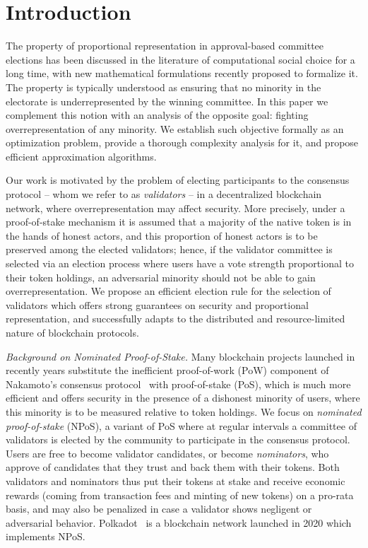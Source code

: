 \section{Introduction}

The property of proportional representation in approval-based committee elections has been discussed in the literature of computational social choice for a long time, with new mathematical formulations recently proposed to formalize it. 
The property is typically understood as ensuring that no minority in the electorate is underrepresented by the winning committee. 
In this paper we complement this notion with an analysis of the opposite goal: fighting overrepresentation of any minority. 
We establish such objective formally as an optimization problem, provide a thorough complexity analysis for it, and propose efficient approximation algorithms. 

Our work is motivated by the problem of electing participants to the consensus protocol -- whom we refer to as \emph{validators} -- in a decentralized blockchain network, where overrepresentation may affect security. 
More precisely, under a proof-of-stake mechanism it is assumed that a majority of the native token is in the hands of honest actors, and this proportion of honest actors is to be preserved among the elected validators; 
hence, if the validator committee is selected via an election process where users have a vote strength proportional to their token holdings, an adversarial minority should not be able to gain overrepresentation. 
We propose an efficient election rule for the selection of validators which offers strong guarantees on security and proportional representation, and successfully adapts to the distributed and resource-limited nature of blockchain protocols.

\emph{Background on Nominated Proof-of-Stake.}
Many blockchain projects launched in recently years substitute the inefficient proof-of-work (PoW) component of Nakamoto's consensus protocol~\cite{nakamoto2019bitcoin} with proof-of-stake (PoS), which is much more efficient and offers security in the presence of a dishonest minority of users, where this minority is to be measured relative to token holdings. 
We focus on \emph{nominated proof-of-stake} (NPoS), a variant of PoS where at regular intervals a committee of validators is elected by the community to participate in the consensus protocol. 
Users are free to become validator candidates, or become \emph{nominators}, who approve of candidates that they trust and back them with their tokens. 
Both validators and nominators thus put their tokens at stake and receive economic rewards (coming from transaction fees and minting of new tokens) on a pro-rata basis, and may also be penalized in case a validator shows negligent or adversarial behavior.
Polkadot~\cite{burdges2020overview} is a blockchain network launched in 2020 which implements NPoS.

